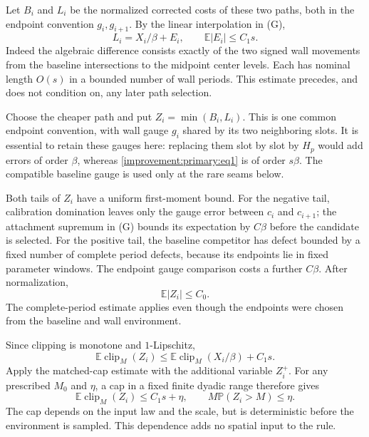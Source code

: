 Let $B_i$ and $L_i$ be the normalized corrected costs of these two
paths, both in the endpoint convention $g_i,g_{i+1}$. By the linear
interpolation in (G),
\begin{equation}
 L_i=X_i/\beta+E_i,\qquad \mathbb E|E_i|\leq C_1s.
 \label{improvement:primary:eq1}
\end{equation}
Indeed the algebraic difference consists exactly of the two signed
wall movements from the baseline intersections to the midpoint
center levels. Each has nominal length $O(s)$ in a bounded number of
wall periods. This estimate precedes, and does not condition on, any
later path selection.

Choose the cheaper path and put $Z_i=\min(B_i,L_i)$. This is one
common endpoint convention, with wall gauge $g_i$ shared by its two
neighboring slots. It is essential to retain these gauges here:
replacing them slot by slot by $H_p$ would add errors of order
$\beta$, whereas \eqref{improvement:primary:eq1} is of order $s\beta$.
The compatible baseline gauge is used only at the rare seams below.

Both tails of $Z_i$ have a uniform first-moment bound. For the negative
tail, calibration domination leaves only the gauge error between $c_i$
and $c_{i+1}$; the attachment supremum in (G) bounds its expectation by
$C\beta$ before the candidate is selected. For the positive tail, the
baseline competitor has defect bounded by a fixed number of complete
period defects, because its endpoints lie in fixed parameter windows.
The endpoint gauge comparison costs a further $C\beta$. After normalization,
\begin{equation}
 \mathbb E|Z_i|\leq C_0.
 \label{improvement:primary:eq2}
\end{equation}
The complete-period estimate applies even though the endpoints were
chosen from the baseline and wall environment.

Since clipping is monotone and $1$-Lipschitz,
\begin{equation}
 \mathbb E\operatorname{clip}_M(Z_i)
 \leq\mathbb E\operatorname{clip}_M(X_i/\beta)+C_1s.
 \label{improvement:primary:eq3}
\end{equation}
Apply the matched-cap estimate with the additional variable $Z_i^+$.
For any prescribed $M_0$ and $\eta$, a cap in a fixed finite dyadic
range therefore gives
\begin{equation}
 \mathbb E\operatorname{clip}_M(Z_i)\leq C_1s+\eta,
 \qquad M\mathbb P(Z_i>M)\leq\eta.
 \label{improvement:primary:eq4}
\end{equation}
The cap depends on the input law and the scale, but is deterministic
before the environment is sampled. This dependence adds no spatial
input to the rule.

